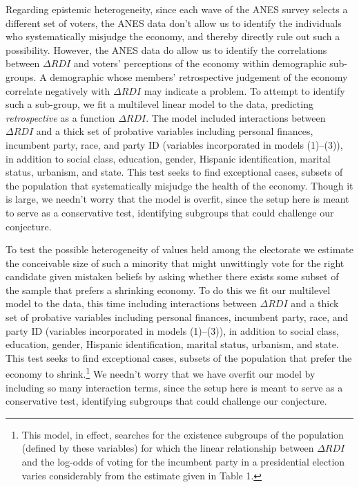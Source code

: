 \documentclass[11pt]{article}
\begin{document}
Regarding epistemic heterogeneity, since each wave of the ANES survey selects a different set of voters, the ANES data don't allow us to identify the individuals who
systematically misjudge the economy, and thereby directly rule out
such a possibility. 
However, the ANES data do allow us to identify the correlations between
$\Delta RDI$ and voters' perceptions of the economy within demographic
sub-groups. 
A demographic whose members' retrospective judgement of the economy
correlate negatively with $\Delta RDI$ may indicate a problem.
To attempt to identify such a sub-group, we fit a multilevel linear model to the
data, predicting \emph{retrospective} as a function $\Delta RDI$. 
The model included interactions between $\Delta RDI$ and a thick set of probative variables including personal finances, incumbent party, race, and party ID (variables incorporated in models (1)--(3)), %
in addition to social class, education, gender, Hispanic
identification, marital status, urbanism, and state. This test seeks
to find exceptional cases, subsets of the population that
systematically misjudge the health of the economy. 
Though it is large, we needn't worry that the model is overfit, since the setup here is meant to serve as a conservative test, identifying subgroups that could challenge our conjecture. 

To test the possible heterogeneity of values held among the electorate we estimate the conceivable size of such a minority that might unwittingly vote for the right candidate given mistaken beliefs by asking whether there exists some subset of the sample that prefers a shrinking economy. %
To do this we fit our multilevel model to the data, this time including interactions between $\Delta RDI$ and a thick set of probative variables including personal finances, incumbent party, race, and party ID (variables incorporated in models (1)--(3)), %
in addition to social class, education, gender, Hispanic identification, marital status, urbanism, and state. This test seeks to find exceptional cases, subsets of the population that prefer the economy to shrink.\footnote{
This model, in effect, searches for the existence subgroups of the population (defined by these variables) for which the linear relationship between $\Delta RDI$ and the log-odds of voting for the incumbent party in a presidential election varies considerably from the estimate given in Table 1.}  We needn't worry that we have overfit our model by including so many interaction terms, since the setup here is meant to serve as a conservative test, identifying subgroups that could challenge our conjecture. 
\end{document}
